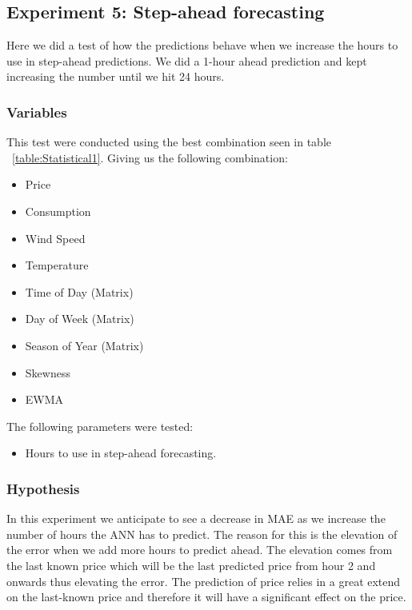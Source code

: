 \newpage
\subsection{Experiment 5: Step-ahead forecasting}
Here we did a test of how the predictions behave when we increase the hours to use in step-ahead predictions. We did a 1-hour ahead prediction and kept increasing the number until we hit 24 hours.

\subsubsection{Variables}
This test were conducted using the best combination seen in table ~\ref{table:Statistical1}. Giving us the following combination:
\begin{itemize}
	\item Price
	\item Consumption
	\item Wind Speed
	\item Temperature
	\item Time of Day (Matrix)
	\item Day of Week (Matrix)
	\item Season of Year (Matrix)
	\item Skewness
	\item EWMA
\end{itemize}

The following parameters were tested:

\begin{itemize}
	\item Hours to use in step-ahead forecasting.
\end{itemize}

\subsubsection{Hypothesis}
In this experiment we anticipate to see a decrease in MAE as we increase the number of hours the ANN has to predict. The reason for this is the elevation of the error when we add more hours to predict ahead. The elevation comes from the last known price which will be the last predicted price from hour 2 and onwards thus elevating the error. The prediction of price relies in a great extend on the last-known price and therefore it will have a significant effect on the price.

